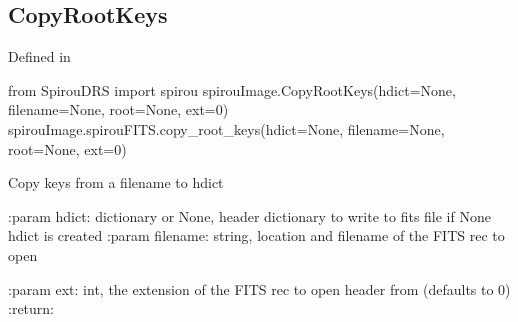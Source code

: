 \begin{minipage}{\textwidth}
\subsection{CopyRootKeys}

Defined in \spirouImage{}

\begin{pythonbox}
from SpirouDRS import spirou
spirouImage.CopyRootKeys(hdict=None, filename=None, root=None, ext=0)
spirouImage.spirouFITS.copy_root_keys(hdict=None, filename=None, root=None, ext=0)
\end{pythonbox}

\begin{pythondocstring}
Copy keys from a filename to hdict

:param hdict: dictionary or None, header dictionary to write to fits file
              if None hdict is created
:param filename: string, location and filename of the FITS rec to open

:param ext: int, the extension of the FITS rec to open header from
            (defaults to 0)
:return:
\end{pythondocstring}
\end{minipage}



